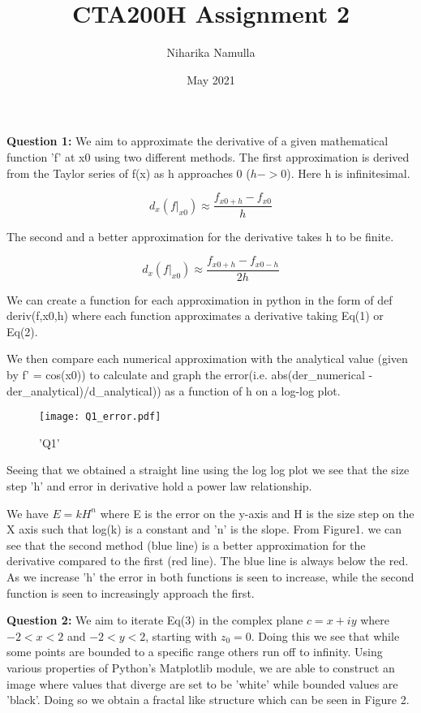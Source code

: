 \documentclass[12pt, a4paper]{article}
\title{CTA200H Assignment 2}
\author{Niharika Namulla}
\date{May 2021}
\begin{document}
\textbf{Question 1:}
We aim to approximate the derivative of a given mathematical function 'f' at x0 using two different methods.
The first approximation is derived from the Taylor series of f(x) as h approaches 0 ($h -> 0$). Here h is infinitesimal.

\begin{equation}
\displaystyle
d_x(f|_{x0}) \approx \frac{f_{x0+h}- f_{x0}}{h}
\end{equation}


The second and a better approximation for the derivative takes h to be finite.

\begin{equation}
\displaystyle
d_x(f|_{x0}) \approx \frac{f_{x0+h} - f_{x0-h}}{2h}
\end{equation}

We can create a function for each approximation in python in the form of def deriv(f,x0,h) where each function approximates a derivative taking Eq(1) or Eq(2). 

We then compare each numerical approximation with the analytical value (given by f' = cos(x0)) to calculate and graph the error(i.e. abs(der\_numerical -der\_analytical)/d\_analytical)) as a function of h on a log-log plot.



\begin{figure}[htbp]
\texttt{[image: Q1\_error.pdf]}
\caption{'Q1'}
\end{figure}
Seeing that we obtained a straight line using the log log plot we see that the size step 'h' and error in derivative hold a power law relationship.

We have $E = kH^{n}$ where E is the error on the y-axis and H is the size step on the X axis such that log(k) is a constant and 'n' is the slope. 
From Figure1. we can see that the second method (blue line) is a better approximation for the derivative compared to the first (red line). The blue line is always below the red. As we increase 'h' the error in both functions is seen to increase, while the second function is seen to increasingly approach the first. \par



\textbf{Question 2:}
We aim to iterate Eq(3) in the complex plane $c = x + iy$ where $-2<x<2$ and $-2<y<2$, starting with $z_0 = 0$. Doing this we see that while some points are bounded to a specific range others run off to infinity.
Using various properties of Python's Matplotlib module, we are able to construct an image where values that diverge are set to be 'white' while bounded values are 'black'. 
Doing so we obtain a fractal like structure which can be seen in Figure 2.
\end{document}
